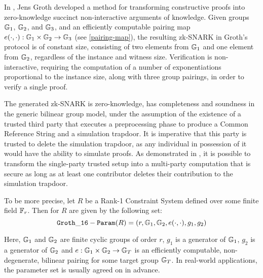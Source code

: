 In \cite{Groth16}, Jens Groth developed a method for transforming constructive proofs into zero-knowledge succinct non-interactive arguments of knowledge. Given groups $\mathbb{G}_1$, $\mathbb{G}_2$, and $\mathbb{G}_3$, and an efficiently computable pairing map $e(\cdot,\cdot): \mathbb{G}_1 \times \mathbb{G}_2 \to \mathbb{G}_3$ (see \ref{pairing-map}), the resulting zk-SNARK in Groth's protocol is of constant size, consisting of two elements from $\mathbb{G}_1$ and one element from $\mathbb{G}_2$, regardless of the instance and witness size. Verification is non-interactive, requiring the computation of a number of exponentiations proportional to the instance size, along with three group pairings, in order to verify a single proof.

The generated zk-SNARK is zero-knowledge, has completeness and soundness in the generic bilinear group model, under the assumption of the existence of a trusted third party that executes a preprocessing phase to produce a Common Reference String and a simulation trapdoor. It is imperative that this party is trusted to delete the simulation trapdoor, as any individual in possession of it would have the ability to simulate proofs. As demonstrated in \cite{bowe-17}, it is possible to transform the single-party trusted setup into a multi-party computation that is secure as long as at least one contributor deletes their contribution to the simulation trapdoor. 

To be more precise, let $R$ be a Rank-1 Constraint System defined over some finite field $\mathbb{F}_r$. Then  for $R$ are given by the following set:
\begin{equation}
\label{groth16-parameters}
\mathtt{Groth\_16-Param}(R)=(r, \mathbb{G}_1, \mathbb{G}_2, e(\cdot,\cdot), g_1,g_2)
\end{equation}

Here, $\mathbb{G}_1$ and $\mathbb{G}_2$ are finite cyclic groups of order $r$, $g_1$ is a generator of $\mathbb{G}_1$, $g_2$ is a generator of $\mathbb{G}_2$ and $e: \mathbb{G}_1 \times \mathbb{G}_2 \to \mathbb{G}_T$ is an efficiently computable, non-degenerate, bilinear pairing for some target group $\mathbb{G}_T$. In real-world applications, the parameter set is usually agreed on in advance. 

